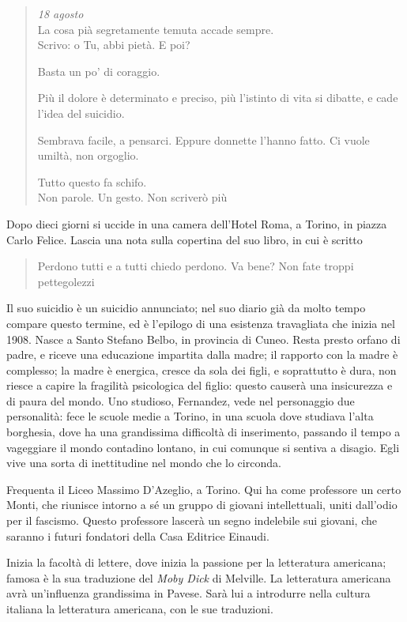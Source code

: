 \documentclass[a4paper, twoside, titlepage]{book}
\newcommand{\citazione}[1]{%
  \begin{quotation}
  \begin{linenumbers}
  \modulolinenumbers[5]
  \begingroup
  \setlength{\parindent}{0cm}
  \noindent #1
  \endgroup
  \end{linenumbers}
  \end{quotation}\setcounter{linenumber}{1}
  }
\begin{document}
\citazione{\textit{18 agosto}\\
La cosa pià segretamente temuta accade sempre.\\
Scrivo: o Tu, abbi pietà. E poi?

\vspace{1em}
\noindent Basta un po' di coraggio.

\vspace{1em}
\noindent Più il dolore è determinato e preciso, più l'istinto di vita si dibatte, e cade l'idea del suicidio.

\vspace{1em}
\noindent Sembrava facile, a pensarci. Eppure donnette l'hanno fatto. Ci vuole umiltà, non orgoglio.

\vspace{1em}
\noindent Tutto questo fa schifo.\\
Non parole. Un gesto. Non scriverò più}

Dopo dieci giorni si uccide in una camera dell'Hotel Roma, a Torino, in piazza Carlo Felice. Lascia una nota sulla copertina del suo libro, in cui è scritto
\citazione{Perdono tutti e a tutti chiedo perdono. Va bene? Non fate troppi pettegolezzi}

Il suo suicidio è un suicidio annunciato; nel suo diario già da molto tempo compare questo termine, ed è l'epilogo di una esistenza travagliata che inizia nel 1908. Nasce a Santo Stefano Belbo, in provincia di Cuneo.
Resta presto orfano di padre, e riceve una educazione impartita dalla madre; il rapporto con la madre è complesso; la madre è energica, cresce da sola dei figli, e soprattutto è dura, non riesce a capire la fragilità psicologica del figlio: questo causerà una insicurezza e di paura del mondo. 
Uno studioso, Fernandez, vede nel personaggio due personalità: fece le scuole medie a Torino, in una scuola dove studiava l'alta borghesia, dove ha una grandissima difficoltà di inserimento, passando il tempo a vageggiare il mondo contadino lontano, in cui comunque si sentiva a disagio.
Egli vive una sorta di inettitudine nel mondo che lo circonda.

Frequenta il Liceo Massimo D'Azeglio, a Torino. Qui ha come professore un certo Monti, che riunisce intorno a sé un gruppo di giovani intellettuali, uniti dall'odio per il fascismo. Questo professore lascerà un segno indelebile sui giovani, che saranno i futuri fondatori della Casa Editrice Einaudi.

Inizia la facoltà di lettere, dove inizia la passione per la letteratura americana; famosa è la sua traduzione del \textit{Moby Dick} di Melville. La letteratura americana avrà un'influenza grandissima in Pavese.
Sarà lui a introdurre nella cultura italiana la letteratura americana, con le sue traduzioni.
\end{document}
